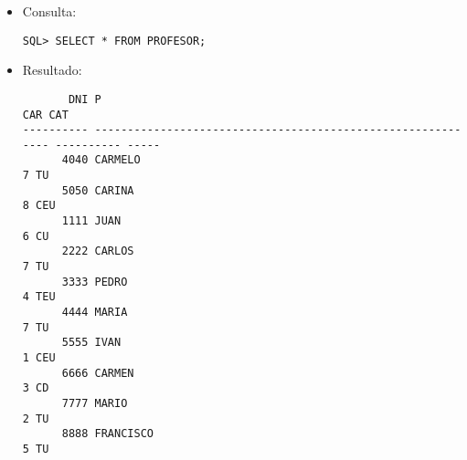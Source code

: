 \documentclass[11pt]{report}
\begin{document}
\begin{itemize}
  \item Consulta:
  \begin{verbatim}
SQL> SELECT * FROM PROFESOR;
  \end{verbatim}
  \item{Resultado:}
  \begin{verbatim}
       DNI P                                                                   CAR CAT                                                                                                                  
---------- ------------------------------------------------------------ ---------- -----                                                                                                                
      4040 CARMELO                                                               7 TU                                                                                                                   
      5050 CARINA                                                                8 CEU                                                                                                                  
      1111 JUAN                                                                  6 CU                                                                                                                   
      2222 CARLOS                                                                7 TU                                                                                                                   
      3333 PEDRO                                                                 4 TEU                                                                                                                  
      4444 MARIA                                                                 7 TU                                                                                                                   
      5555 IVAN                                                                  1 CEU                                                                                                                  
      6666 CARMEN                                                                3 CD                                                                                                                   
      7777 MARIO                                                                 2 TU                                                                                                                   
      8888 FRANCISCO                                                             5 TU                                                                                                                   

\end{verbatim}
\end{itemize}
\end{document}

